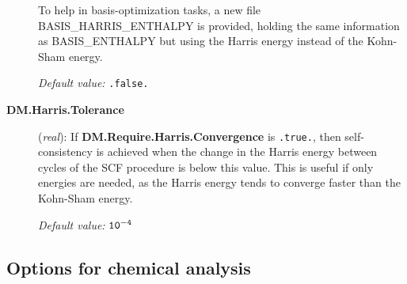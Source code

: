 \documentclass[11pt]{article}
\begin{document}
\begin{description}
To help in basis-optimization tasks, a new file BASIS\_HARRIS\_ENTHALPY
is provided, holding the same information as BASIS\_ENTHALPY but using
the Harris energy instead of the Kohn-Sham energy. 

{\it Default value:} {\tt .false.}


\item[{\bf DM.Harris.Tolerance}] ({\it real}): 
If {\bf DM.Require.Harris.Convergence} is {\tt .true.}, then
self-consistency is achieved when the change in the Harris energy between cycles
of the SCF procedure is below this value.
This is useful if only energies are needed, as the Harris energy tends
to converge faster than the Kohn-Sham energy.

{\it Default value:} {${\tt 10^{-4}}$}

\end{description}


\subsection{Options for chemical analysis}
\end{document}
